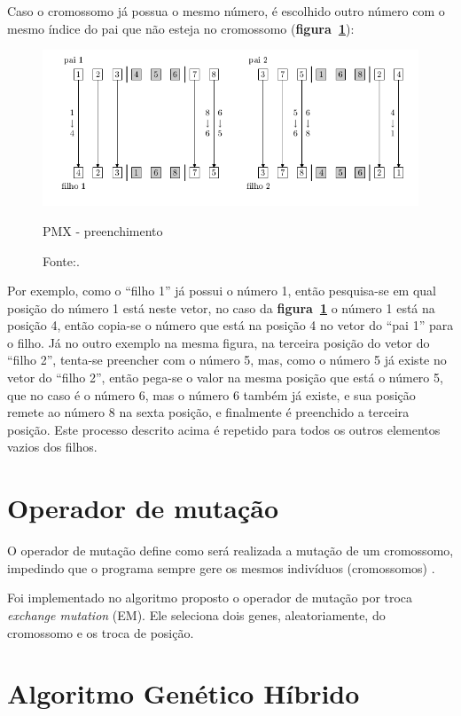 \documentclass{abnt}
\begin{document}
	   		Caso o cromossomo já possua o mesmo número, é escolhido outro número com o mesmo índice do pai que não esteja no cromossomo (\textbf{figura~\ref{pmx2}}):
	   		\begin{figure}[h]
				\centering
		        \includegraphics[width = 14cm,keepaspectratio]{img/pmx2.png}
		        \caption{PMX - preenchimento}
		        \caption*{Fonte:\cite{0012-pdf}.}
		        \label{pmx2}
	   		\end{figure}

	   		Por exemplo, como o ``filho 1'' já possui o número 1, então pesquisa-se em qual posição do número 1 está neste vetor, no caso da \textbf{figura~\ref{pmx2}} o número 1 está na posição 4, então copia-se o número que está na posição 4 no vetor do ``pai 1'' para o filho. Já no outro exemplo na mesma figura, na terceira posição do vetor do ``filho 2'', tenta-se preencher com o número 5, mas, como o número 5 já existe no vetor do ``filho 2'', então pega-se o valor na mesma posição que está o número 5, que no caso é o número 6, mas o número 6 também já existe, e sua posição remete ao número 8 na sexta posição, e finalmente é preenchido a terceira posição. 
	   		Este processo descrito acima é repetido para todos os outros elementos vazios dos filhos.
	   		  
		\section{Operador de mutação}
			\label{Sem}
			O operador de mutação define como será realizada a mutação de um cromossomo, impedindo que o programa sempre gere os mesmos indivíduos (cromossomos) \cite{0012-pdf}.

			Foi implementado no algoritmo proposto o operador de mutação por troca \textit{exchange mutation} (EM). Ele seleciona dois genes, aleatoriamente, do cromossomo e os troca de posição.

		\section{Algoritmo Genético Híbrido}
\end{document}

